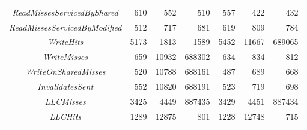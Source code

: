 \begin{table}[h]
\begin{adjustwidth}{-2cm}{-2cm}
\begin{center}
\begin{tabular}{| c | r r r | r r r|}
				\textit{ReadMissesServicedByShared} & 610 & 552 & 510 & 557 & 422 & 432 \\
				\textit{ReadMissesServicedByModified} & 512 & 717 & 681 & 619 & 809 & 784 \\
				\textit{WriteHits} & 5173 & 1813 & 1589 & 5452 & 11667 & 689065 \\
				\textit{WriteMisses} & 659 & 10932 & 688302 & 634 & 834 & 812 \\
				\textit{WriteOnSharedMisses} & 520 & 10788 & 688161 & 487 & 689 & 668 \\
				\textit{InvalidatesSent} & 552 & 10820 & 688191 & 523 & 719 & 698 \\
				\textit{LLCMisses} & 3425 & 4449 & 887435 & 3429 & 4451 & 887434 \\
				\textit{LLCHits} & 1289 & 12875 & 801 & 1228 & 12748 & 715 \\
				\hline
			\end{tabular}
		\end{center}
	\end{adjustwidth}
\end{table}

